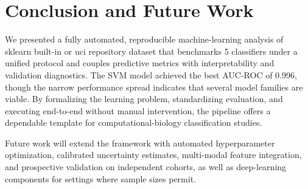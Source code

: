 \documentclass[conference]{IEEEtran}
\begin{document}
\section{Conclusion and Future Work}
\label{sec:conclusion}
We presented a fully automated, reproducible machine-learning analysis of sklearn built-in or uci repository dataset that
benchmarks 5 classifiers under a unified protocol and couples predictive metrics with
interpretability and validation diagnostics. The SVM model achieved the best AUC-ROC of
0.996, though the narrow performance spread indicates that several model families are viable.
By formalizing the learning problem, standardizing evaluation, and executing end-to-end without
manual intervention, the pipeline offers a dependable template for computational-biology
classification studies.

Future work will extend the framework with automated hyperparameter optimization, calibrated
uncertainty estimates, multi-modal feature integration, and prospective validation on independent
cohorts, as well as deep-learning components for settings where sample sizes permit.



\end{document}
